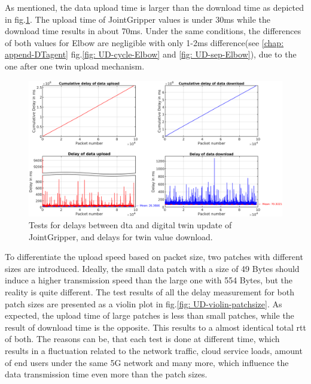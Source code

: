 As mentioned, the data upload time is larger than the download time as depicted in 
fig.\ref{fig: UD-sep-JointGripper}. The upload time of JointGripper values is 
under 30ms while the download time results in about 70ms. Under the same conditions, 
the differences of both values for Elbow are negligible with 
only 1-2ms difference(see \ref{chap: append-DTagent} fig.\ref{fig: UD-cycle-Elbow} and 
\ref{fig: UD-sep-Elbow}), due to the one after one twin upload mechanism. 




\begin{figure}[htb]
    \includegraphics[width=\textwidth]{figures/tests/DT/Delay_UploadDownload_JointGripper.png}
    \centering
    \caption{Tests for delays between \gls{dta} and digital twin update of JointGripper, 
    and delays for twin value download. \label{fig: UD-sep-JointGripper}}
\end{figure}


To differentiate the upload speed based on packet size, two patches with 
different sizes are introduced. Ideally, the small data patch with a size of 
49 Bytes should induce a higher transmission speed than the large one with 
554 Bytes, but the reality is quite different. The test results of all the 
delay measurement for both patch sizes are presented as a violin plot in 
fig.\ref{fig: UD-violin-patchsize}. As expected, the upload time of large 
patches is less than small patches, while the result of download time is the 
opposite. This results to a almost identical total \gls{rtt} of both. 
The reasons can be, that each test is done at different time, which results in 
a fluctuation related to the network traffic, cloud service loads, amount of 
end users under the same 5G network and many more, which influence the data transmission 
time even more than the patch sizes.

